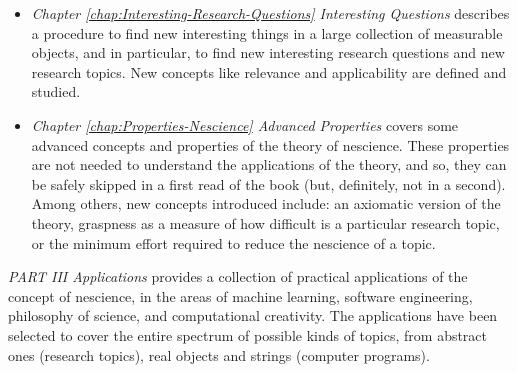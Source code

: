 \begin{itemize}
\item \emph{Chapter \ref{chap:Interesting-Research-Questions} Interesting Questions} describes a procedure to find new interesting things in a large collection of measurable objects, and in particular, to find new interesting research questions and new research topics. New concepts like relevance and applicability are defined and studied.

\item \emph{Chapter \ref{chap:Properties-Nescience} Advanced Properties} covers some advanced concepts and properties of the theory of nescience. These properties are not needed to understand the applications of the theory, and so, they can be safely skipped in a first read of the book (but, definitely, not in a second). Among others, new concepts introduced include: an axiomatic version of the theory, graspness as a measure of how difficult is a particular research topic, or the minimum effort required to reduce the nescience of a topic.

\end{itemize}

\bigskip

\emph{PART III Applications} provides a collection of practical applications of the concept of nescience, in the areas of machine learning, software engineering, philosophy of science, and computational creativity. The applications have been selected to cover the entire spectrum of possible kinds of topics, from abstract ones (research topics), real objects and strings (computer programs).

